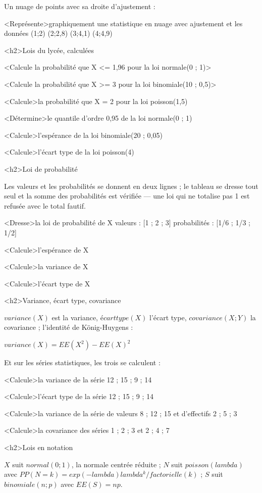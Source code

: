 \documentclass[marges=20, taille=11, precision=3]{texecole}
\begin{document}
Un nuage de points avec sa droite d'ajustement :

<Représente>graphiquement une statistique en nuage avec ajustement et les données {(1;2) (2;2,8) (3;4,1) (4;4,9)}

<h2>Lois du lycée, calculées

<Calcule la probabilité que X <= 1,96 pour la loi normale(0 ; 1)>

<Calcule la probabilité que X >= 3 pour la loi binomiale(10 ; 0,5)>

<Calcule>la probabilité que X = 2 pour la loi poisson(1,5)

<Détermine>le quantile d'ordre 0,95 de la loi normale(0 ; 1)

<Calcule>l'espérance de la loi binomiale(20 ; 0,05)

<Calcule>l'écart type de la loi poisson(4)

<h2>Loi de probabilité

Les valeurs et les probabilités se donnent en deux lignes ; le tableau se dresse tout seul et la somme des probabilités est vérifiée — une loi qui ne totalise pas 1 est refusée avec le total fautif.

<Dresse>la loi de probabilité de X {
	valeurs : [1 ; 2 ; 3]
	probabilités : [1/6 ; 1/3 ; 1/2]
}

<Calcule>l'espérance de X

<Calcule>la variance de X

<Calcule>l'écart type de X

<h2>Variance, écart type, covariance

$variance(X)$ est la variance, $écart type(X)$ l'écart type,
$covariance(X; Y)$ la covariance ; l'identité de König-Huygens :

$variance(X) = EE(X^2) - EE(X)^2$

Et sur les séries statistiques, les trois se calculent :

<Calcule>la variance de la série 12 ; 15 ; 9 ; 14

<Calcule>l'écart type de la série 12 ; 15 ; 9 ; 14

<Calcule>la variance de la série de valeurs 8 ; 12 ; 15 et d'effectifs 2 ; 5 ; 3

<Calcule>la covariance des séries 1 ; 2 ; 3 et 2 ; 4 ; 7

<h2>Lois en notation

$X$ suit $normal(0; 1)$, la normale centrée réduite ; $N$ suit
$poisson(lambda)$ avec $PP(N = k) = exp(-lambda) lambda^k / factorielle(k)$ ;
$S$ suit $binomiale(n; p)$ avec $EE(S) = n p$.
\end{document}

